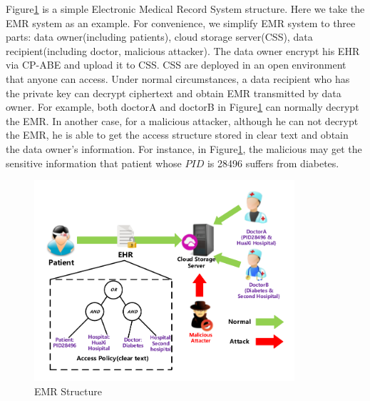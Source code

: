 \documentclass[smallextended]{svjour3}       %
\begin{document}
	Figure\ref{EMR1} is a simple Electronic Medical Record System structure. 
	Here we take the EMR system as an example. 
	For convenience, we simplify EMR system to three parts: data owner(including patients), cloud storage server(CSS), data recipient(including doctor, malicious attacker).
	The data owner encrypt his EHR via CP-ABE and upload it to CSS. 
	CSS are deployed in an open environment that anyone can access.
	Under normal circumstances, a data recipient who has the private key can decrypt ciphertext and obtain EMR transmitted by data owner.
	For example, both doctorA and doctorB in Figure\ref{EMR1} can normally decrypt the EMR.
	In another case, for a malicious attacker, although he can not decrypt the EMR, he is able to get the access structure stored in clear text and obtain the data owner's information.
	For instance, in Figure\ref{EMR1}, the malicious may get the sensitive information that patient whose $PID$ is 28496 suffers from diabetes.  


	\begin{figure}\label{EMR1}
		\centering
		\includegraphics[width=3.8in, keepaspectratio]{EMR1.pdf}
		\caption{EMR Structure}
	\end{figure}
 
\end{document}
